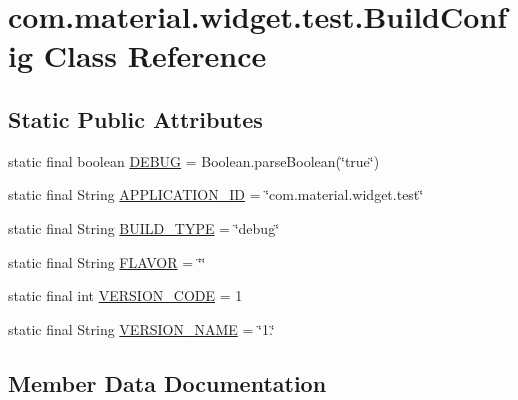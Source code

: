 \hypertarget{classcom_1_1material_1_1widget_1_1test_1_1_build_config}{}\section{com.\+material.\+widget.\+test.\+Build\+Config Class Reference}
\label{classcom_1_1material_1_1widget_1_1test_1_1_build_config}
\subsection*{Static Public Attributes}
\begin{DoxyCompactItemize}
\item 
static final boolean \hyperlink{classcom_1_1material_1_1widget_1_1test_1_1_build_config_adfc2a84f4038f24b601c1b8e6ccbdf92}{D\+E\+B\+UG} = Boolean.\+parse\+Boolean(\char`\"{}true\char`\"{})
\item 
static final String \hyperlink{classcom_1_1material_1_1widget_1_1test_1_1_build_config_a91c2b4ac2179f4477acd81bdccd867b9}{A\+P\+P\+L\+I\+C\+A\+T\+I\+O\+N\+\_\+\+ID} = \char`\"{}com.\+material.\+widget.\+test\char`\"{}
\item 
static final String \hyperlink{classcom_1_1material_1_1widget_1_1test_1_1_build_config_aae869c0d92eff8abab3f7757e7c636d2}{B\+U\+I\+L\+D\+\_\+\+T\+Y\+PE} = \char`\"{}debug\char`\"{}
\item 
static final String \hyperlink{classcom_1_1material_1_1widget_1_1test_1_1_build_config_ae5c25a5e5151b3ef3cf758cdeeea4964}{F\+L\+A\+V\+OR} = \char`\"{}\char`\"{}
\item 
static final int \hyperlink{classcom_1_1material_1_1widget_1_1test_1_1_build_config_a4069b8b3001646bef230d10a9d19d65e}{V\+E\+R\+S\+I\+O\+N\+\_\+\+C\+O\+DE} = 1
\item 
static final String \hyperlink{classcom_1_1material_1_1widget_1_1test_1_1_build_config_aa3c26a60a839314dc48ade6e02b49edc}{V\+E\+R\+S\+I\+O\+N\+\_\+\+N\+A\+ME} = \char`\"{}1.\char`\"{}
\end{DoxyCompactItemize}


\subsection{Member Data Documentation}
\mbox{\label{classcom_1_1material_1_1widget_1_1test_1_1_build_config_a91c2b4ac2179f4477acd81bdccd867b9}} 
